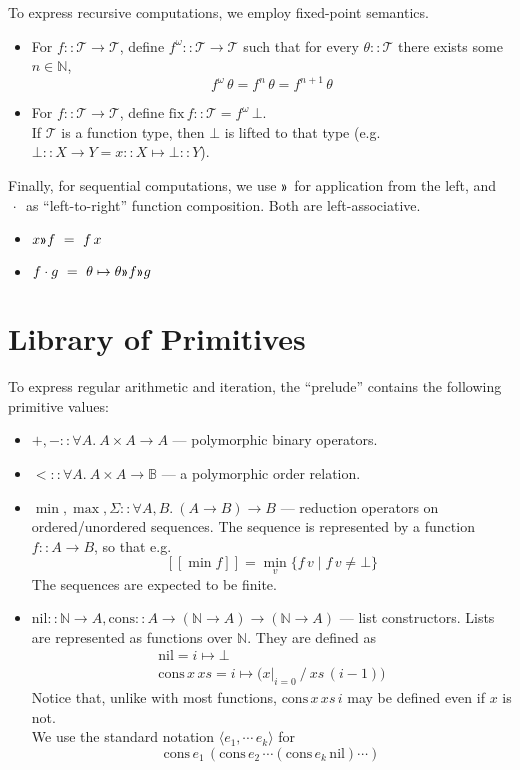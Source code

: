 \documentclass{article}
\newcommand\N{\mathbb{N}}
\newcommand\B{\mathbb{B}}
\newcommand\T{\mathcal{T}}
\newcommand\semp[1]{[\![{#1}]\!]}
\begin{document}
To express recursive computations, we employ fixed-point semantics.

\newcommand\fix{\mathrm{fix}\,}

\begin{itemize}
  \item For $f :: \T\to\T$, define $f^\omega :: \T\to\T$ such that for every $\theta :: \T$ there exists some $n\in\N$,
    \[f^\omega\,\theta = f^n\,\theta = f^{n+1}\,\theta\]
  \item For $f :: \T\to\T$, define $\fix f :: \T = f^\omega\,\bot$.\\
    If $\T$ is a function type, then $\bot$ is lifted to that type (e.g. $\bot :: X\to Y = x :: X \mapsto \bot :: Y$).
\end{itemize}


\newcommand\applt{\textsf{\guillemotright}}

Finally, for sequential computations, we use $\applt$ for application from the left, 
and $\,\cdot\,$ as ``left-to-right'' function composition. Both are left-associative.
\begin{itemize}
  \item $x\applt f ~=~ f\,x$
  \item $f\cdot g ~=~ \theta\mapsto \theta \applt f \applt g$
\end{itemize}


\section{Library of Primitives}

To express regular arithmetic and iteration, the ``prelude'' contains the following primitive
values:

\begin{itemize}
  \item ${+}, {-} :: \forall A.~A\times A\to A$ --- polymorphic binary operators.
  \item ${<} :: \forall A. ~A\times A\to\B$ --- a polymorphic order relation.
  \item $\min, \max, \Sigma :: \forall A,B.~ (A\to B)\to B$ --- reduction operators
    on ordered/unordered sequences. The sequence is represented by a function $f :: A\to B$,
    so that e.g. \[\semp{\min f} = \min_v \{f\,v \;|\; f\,v\neq\bot\}\]
    The sequences are expected to be finite.
  \item $\mathrm{nil} :: \N\to A, \mathrm{cons} :: A \to (\N\to A)\to(\N\to A)$ --- list constructors.
    Lists are represented as functions over $\N$. They are defined as
    \[\begin{array}{l}\mathrm{nil}=i\mapsto\bot \\
        \mathrm{cons}\,x\,xs = i\mapsto \big(x\big|_{i=0} ~\big/~ xs\,(i-1)\big)\end{array}\]
    Notice that, unlike with most functions, $\mathrm{cons}\,x\,xs\,i$ may be defined even if $x$ is not.\\
    We use the standard notation $\langle e_1,\cdots\,e_k\rangle$ for 
    \[\mathrm{cons}\,e_1\,(\mathrm{cons}\, e_2\,\cdots(\mathrm{cons}\,e_k\,\mathrm{nil})\cdots)\]
\end{itemize}
\end{document}
